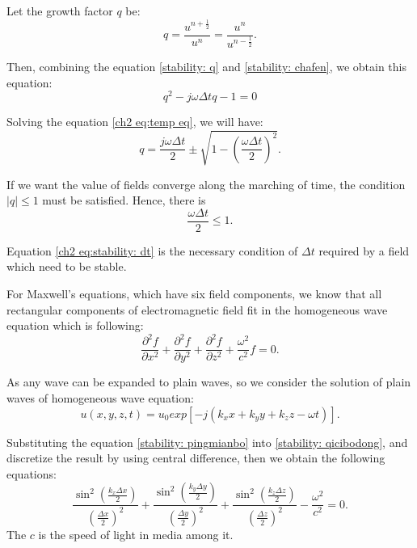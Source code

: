 Let the growth factor $q$ be:
\begin{equation}\label{stability: q}
	q=\frac{u^{n+\frac{1}{2}}}{u^n}=\frac{u^n}{u^{n-\frac{1}{2}}}.
\end{equation}

Then, combining the equation \eqref{stability: q} and \eqref{stability: chafen}, we obtain this equation:
\begin{equation}
q^2-j\omega \Delta tq-1=0
\end{equation}\label{ch2 eq:temp eq}

Solving the equation \eqref{ch2 eq:temp eq}, we will have:
\begin{equation}
q=\frac{j\omega \Delta t}{2}\pm\sqrt{1-\left(\frac{\omega \Delta  t}{2}\right)^2}.
\end{equation}

If we want the value of fields converge along the marching of time, the condition $|q|\leqslant 1$ must be satisfied. Hence, there is
\begin{equation}\label{ch2 eq:stability: dt}
\frac{\omega \Delta t}{2}\leqslant 1.
\end{equation}

Equation \eqref{ch2 eq:stability: dt} is the necessary condition of $\Delta t$ required by a field which need to be stable.

For Maxwell's equations, which have six field components, we know that all rectangular components of electromagnetic field fit in the homogeneous wave equation which is following:
\begin{equation}\label{stability: qicibodong}
\frac{\partial^2 f}{\partial x^2}+\frac{\partial^2 f}{\partial y^2}+\frac{\partial^2 f}{\partial z^2}+\frac{\omega^2}{c^2}f=0.
\end{equation}

As any wave can be expanded to plain waves, so we consider the solution of plain waves of homogeneous wave equation:
\begin{equation}\label{stability: pingmianbo}
u(x,y,z,t)=u_0 exp[-j(k_x x+k_y y+k_z z-\omega t)].
\end{equation}

Substituting the equation \eqref{stability: pingmianbo} into \eqref{stability: qicibodong}, and discretize the result by using central difference, then we obtain the following equations:
\begin{equation}\label{stability: qicibodong lisan}
\frac{\sin^2 \left( \frac{k_x\Delta x}{2} \right)}{\left(\frac{\Delta x}{2}\right)^2}+
\frac{\sin^2 \left( \frac{k_y\Delta y}{2} \right)}{\left(\frac{\Delta y}{2}\right)^2}+
\frac{\sin^2 \left( \frac{k_z\Delta z}{2} \right)}{\left(\frac{\Delta z}{2}\right)^2}-
\frac{\omega^2}{c^2}=0.
\end{equation}
The $c$ is the speed of light in media among it.

